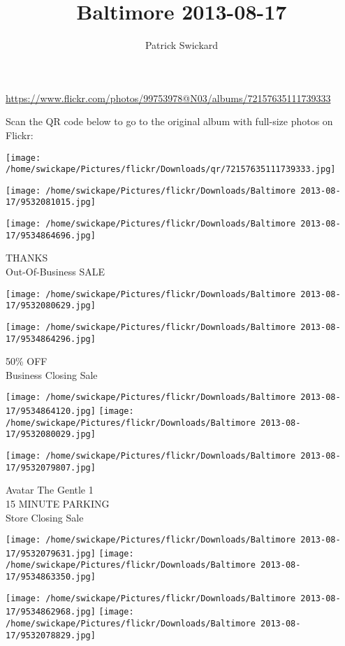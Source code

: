 \documentclass[10pt,letterpaper]{article}
\title{Baltimore 2013-08-17}
\author{Patrick Swickard}
\date{}
\begin{document}
\maketitle

\url{https://www.flickr.com/photos/99753978@N03/albums/72157635111739333}

Scan the QR code below to go to the original album with full-size photos on Flickr:

\texttt{[image: /home/swickape/Pictures/flickr/Downloads/qr/72157635111739333.jpg]}
\pagebreak

\texttt{[image: /home/swickape/Pictures/flickr/Downloads/Baltimore 2013-08-17/9532081015.jpg]}

\vspace{0.25in}
\texttt{[image: /home/swickape/Pictures/flickr/Downloads/Baltimore 2013-08-17/9534864696.jpg]}

THANKS\\
Out{-}Of{-}Business SALE
\pagebreak

\texttt{[image: /home/swickape/Pictures/flickr/Downloads/Baltimore 2013-08-17/9532080629.jpg]}

\vspace{0.25in}
\texttt{[image: /home/swickape/Pictures/flickr/Downloads/Baltimore 2013-08-17/9534864296.jpg]}

50\% OFF\\
Business Closing Sale
\pagebreak

\texttt{[image: /home/swickape/Pictures/flickr/Downloads/Baltimore 2013-08-17/9534864120.jpg]}
\texttt{[image: /home/swickape/Pictures/flickr/Downloads/Baltimore 2013-08-17/9532080029.jpg]}

\vspace{0.25in}
\texttt{[image: /home/swickape/Pictures/flickr/Downloads/Baltimore 2013-08-17/9532079807.jpg]}

Avatar The Gentle 1\\
15 MINUTE PARKING\\
Store Closing Sale
\pagebreak

\texttt{[image: /home/swickape/Pictures/flickr/Downloads/Baltimore 2013-08-17/9532079631.jpg]}
\texttt{[image: /home/swickape/Pictures/flickr/Downloads/Baltimore 2013-08-17/9534863350.jpg]}

\texttt{[image: /home/swickape/Pictures/flickr/Downloads/Baltimore 2013-08-17/9534862968.jpg]}
\texttt{[image: /home/swickape/Pictures/flickr/Downloads/Baltimore 2013-08-17/9532078829.jpg]}
\end{document}
